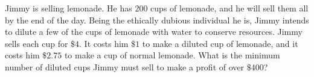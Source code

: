 Jimmy is selling lemonade. He has $200$ cups of lemonade, and he will sell them all by the end of the day. Being the ethically dubious individual he is, Jimmy intends to dilute a few of the cups of lemonade with water to conserve resources. Jimmy sells each cup for $\$4$. It costs him $\$ 1$ to make a diluted cup of lemonade, and it costs him $\$2.75$ to make a cup of normal lemonade. What is the minimum number of diluted cups Jimmy must sell to make a profit of over $\$400$?
